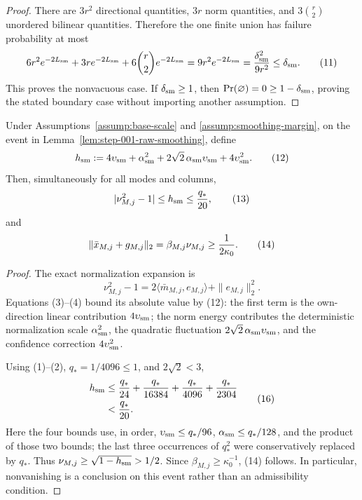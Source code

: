\begin{lemma}
\begin{proof}
There are $3r^2$ directional quantities, $3r$ norm quantities, and
$3\binom r2$ unordered bilinear quantities. Therefore the one finite
union has failure probability at most
\[
6r^2e^{-2L_{\rm sm}}+3re^{-2L_{\rm sm}}
+6{r\choose2}e^{-2L_{\rm sm}}
=9r^2e^{-2L_{\rm sm}}
={\delta_{\rm sm}^2\over9r^2}
\le\delta_{\rm sm}.
\tag{11}
\]
This proves the nonvacuous case. If $\delta_{\rm sm}\ge1$, then
$\Pr(\varnothing)=0\ge1-\delta_{\rm sm}$, proving the stated boundary
case without importing another assumption. 


\end{proof}
\end{lemma}
\begin{lemma}\label{lem:step-001-normalization}
Under Assumptions~\ref{assump:base-scale} and
\ref{assump:smoothing-margin}, on the event in
Lemma~\ref{lem:step-001-raw-smoothing}, define
\[
h_{\rm sm}:=4\upsilon_{\rm sm}+\alpha_{\rm sm}^2
+2\sqrt2\,\alpha_{\rm sm}\upsilon_{\rm sm}
+4\upsilon_{\rm sm}^2.
\tag{12}
\]
Then, simultaneously for all modes and columns,
\[
|\nu_{M,j}^2-1|\le h_{\rm sm}\le {q_*\over20},
\tag{13}
\]
and
\[
\|\bar x_{M,j}+g_{M,j}\|_2
=\beta_{M,j}\nu_{M,j}\ge {1\over2\kappa _0}.
\tag{14}
\]

\begin{proof}
The exact normalization expansion is
\[
\nu_{M,j}^2-1
=2\langle\bar m_{M,j},e_{M,j}\rangle+\|e_{M,j}\|_2^2.
\tag{15}
\]
Equations (3)--(4) bound its absolute value by (12): the first term is the
own-direction linear contribution $4\upsilon_{\rm sm}$; the norm energy
contributes the deterministic normalization scale
$\alpha_{\rm sm}^2$, the quadratic fluctuation
$2\sqrt2\,\alpha_{\rm sm}\upsilon_{\rm sm}$, and the confidence
correction $4\upsilon_{\rm sm}^2$.

Using (1)--(2), $q_*=1/4096\le1$, and $2\sqrt2<3$,
\[
\begin{aligned}
h_{\rm sm}
&\le {q_*\over24}+{q_*\over16384}
  +{q_*\over4096}+{q_*\over2304}\\
&<{q_*\over20}.
\end{aligned}
\tag{16}
\]
Here the four bounds use, in order,
$\upsilon_{\rm sm}\le q_*/96$,
$\alpha_{\rm sm}\le q_*/128$, and the product of those two bounds;
the last three occurrences of $q_*^2$ were conservatively replaced by
$q_*$. Thus
$\nu_{M,j}\ge\sqrt{1-h_{\rm sm}}>1/2$. Since
$\beta_{M,j}\ge\kappa _0^{-1}$, (14) follows. In particular,
nonvanishing is a conclusion on this event rather than an admissibility
condition. 


\end{proof}
\end{lemma}
